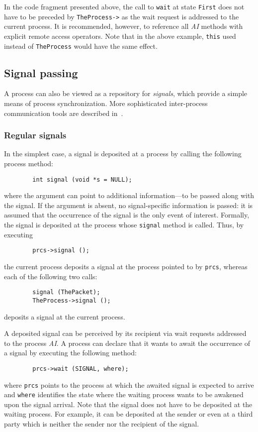 In the code fragment presented above, the call to {\tt wait} at
state {\tt First} does not have to be preceded by {\tt TheProcess->} as
the wait request is addressed to the current process.
It is recommended, however, to reference all {\em AI\/} methods with
explicit remote access operators.
Note that in the above example,
{\tt this\/} used instead of {\tt TheProcess} would have the same
effect.

\subsection{Signal passing}
\label{rm_pr_sp}

A process can also be viewed as a repository for {\em signals}, which
provide a simple means of process synchronization.
More sophisticated inter-process communication tools are described
in~.

\subsubsection{Regular signals}
\label{rm_pr_sp_rs}

In the simplest case, a signal is deposited at a process by calling
the following process method:
\begin{verbatim}
        int signal (void *s = NULL);
\end{verbatim}
where the argument can point to additional information---to
be passed along with the signal.
If the argument is absent, no signal-specific information is passed: it is
assumed that the occurrence of the signal is the only event of interest.
Formally, the signal is deposited at the process whose {\tt signal} method
is called.
Thus, by executing
\begin{verbatim}
        prcs->signal ();
\end{verbatim}
the current process deposits a signal at the process pointed to by
{\tt prcs}, whereas each of the following two calls:
\begin{verbatim}
        signal (ThePacket);
        TheProcess->signal ();
\end{verbatim}
deposits a signal at the current process.

A deposited signal can be perceived by its recipient via wait requests
addressed to the process {\em AI}.
A process can declare that it wants to await the occurrence of a signal
by executing the following method:
\begin{verbatim}
        prcs->wait (SIGNAL, where);
\end{verbatim}
where {\tt prcs} points to the process at which the awaited signal is expected
to arrive and {\tt where} identifies the state where the waiting
process wants to be awakened upon the signal arrival.
Note that the signal does not have to be deposited at the waiting process.
For example, it can be deposited at the sender or even at a third party which
is neither the sender nor the recipient of the signal.

